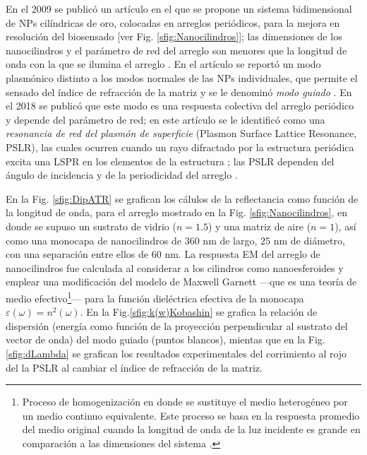 En el 2009 se public\'o un art\'iculo \cite{kabashin2009plasmonic} en el que se propone un sistema bidimensional de NPs cilíndricas de oro, colocadas en arreglos periódicos, para la mejora en resoluci\'on  del biosensado [ver Fig. \ref{sfig:Nanocilindros}]; las dimensiones de los nanocilindros y el parámetro de red del arreglo son menores que la longitud de onda con la que se ilumina el arreglo \cite{kabashin2009plasmonic}.  En el artículo se reportó un modo plasmónico distinto a los modos normales de las NPs individuales, que permite el sensado del índice de refracción de la matriz y se le denominó \textit{modo guiado} \cite{kabashin2009plasmonic}.  En el 2018 se publicó que este modo es una respuesta colectiva del arreglo periódico \cite{danilov2018ultra} y depende del parámetro de red; en este artículo se le identificó como una \emph{resonancia de red del plasmón de superficie} (Plasmon Surface Lattice Resonance, PSLR), las cuales ocurren cuando un rayo difractado por la estructura periódica excita una LSPR en los elementos de la estructura \cite{vakevainen2013plasmonic}; las PSLR dependen del  ángulo de incidencia y de la periodicidad del arreglo \cite{danilov2018ultra}.  

En la Fig. \ref{sfig:DipATR} se grafican los cálulos de la reflectancia como función de la longitud de onda, para el arreglo mostrado en la Fig.  \ref{sfig:Nanocilindros}, en donde se supuso un sustrato de vidrio ($n=1.5$) y una matriz de aire ($n=1$), así como una monocapa de nanocilindros de $360$ nm de largo, $25$ nm de diámetro, con una separación entre ellos de $60$ nm. La respuesta EM del arreglo de nanocilindros   fue calculada al considerar a los cilindros como nanoesferoides y emplear una modificación del modelo de Maxwell Garnett \cite{atkinson2006anisotropic} ---que es una teoría de medio efectivo\footnote{Proceso de homogenización en donde se sustituye el medio heterogéneo por un medio continuo equivalente.  Este proceso se basa en la respuesta promedio del medio original cuando la longitud de onda de la luz incidente es grande en comparación a las dimensiones del sistema \cite{sihvola1999mixing}.}--- para la función dieléctrica efectiva de la monocapa $\varepsilon(\omega) = n^2 (\omega)$. En la Fig.\ref{sfig:k(w)Kobashin} se grafica la relación de dispersión  (energía como función de la  proyección perpendicular al sustrato del vector de onda)  del modo guiado (puntos blancos), mientas que en la Fig.  \ref{sfig:dLambda} se grafican los resultados experimentales del corrimiento al rojo del la PSLR al cambiar el índice de refracción de la matriz.

